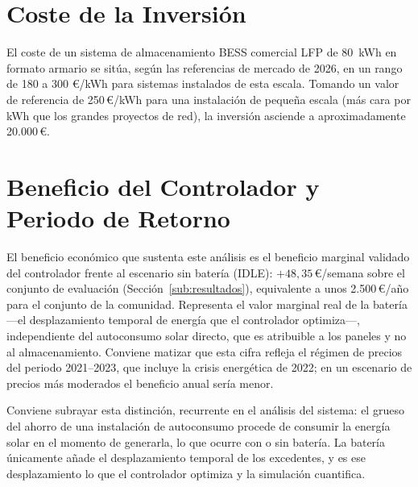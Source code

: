 \documentclass[12pt, a4paper, twoside]{report}
\begin{document}
\section{Coste de la Inversión}

El coste de un sistema de almacenamiento BESS comercial LFP de \SI{80}{kWh} en
formato armario se sitúa, según las referencias de mercado de 2026, en un rango
de 180 a 300 €/kWh para sistemas instalados de esta escala. Tomando un valor de
referencia de 250\,€/kWh para una instalación de pequeña escala (más cara
por kWh que los grandes proyectos de red), la inversión asciende a
aproximadamente 20.000\,€.

\section{Beneficio del Controlador y Periodo de Retorno}

El beneficio económico que sustenta este análisis es el beneficio marginal
validado del controlador frente al escenario sin batería (IDLE):
$+48{,}35$\,€/semana sobre el conjunto de evaluación
(Sección~\ref{sub:resultados}), equivalente a unos 2.500\,€/año para el
conjunto de la comunidad. Representa el valor marginal real de la batería —el
desplazamiento temporal de energía que el controlador optimiza—, independiente
del autoconsumo solar directo, que es atribuible a los paneles y no al
almacenamiento. Conviene matizar que esta cifra refleja el régimen de precios del
periodo 2021--2023, que incluye la crisis energética de 2022; en un escenario de
precios más moderados el beneficio anual sería menor.

Conviene subrayar esta distinción, recurrente en el análisis del sistema: el
grueso del ahorro de una instalación de autoconsumo procede de consumir la
energía solar en el momento de generarla, lo que ocurre con o sin batería. La
batería únicamente añade el desplazamiento temporal de los excedentes, y es ese
desplazamiento lo que el controlador optimiza y la simulación cuantifica.

\begin{center}
\end{center}
\end{document}
